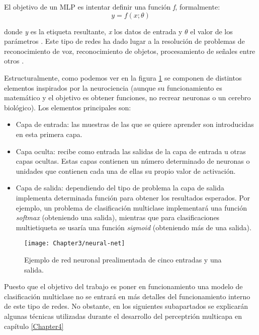 
El objetivo de un MLP es intentar definir una función \textit{f}, formalmente:
\begin{equation}
	y=f(x;\theta)
\end{equation}

donde \textit{y} es la etiqueta resultante, \textit{x} los datos de entrada y $\theta$ el valor de los parámetros \cite{Goodfellow-et-al-2016-Book}. Este tipo de redes ha dado lugar a la resolución de problemas de reconocimiento de voz, reconocimiento de objetos, procesamiento de señales entre otros \cite{DBLP:journals/corr/abs-1206-5538}.

Estructuralmente, como podemos ver en la figura \ref{fig:red-neuronal} se componen de distintos elementos inspirados
por la neurociencia \cite{riesenhuber1999hierarchical} (aunque su funcionamiento es matemático y el objetivo es obtener funciones, no recrear neuronas o un cerebro biológico). Los elementos principales son:


\begin{itemize}
	\item Capa de entrada: las muestras de las que se quiere aprender son introducidas en esta primera capa.

	\item Capa oculta: recibe como entrada las salidas de la capa de entrada u otras capas ocultas. Estas capas
	contienen un número determinado de neuronas o unidades que contienen cada una de ellas su propio valor de
	activación.

	\item Capa de salida: dependiendo del tipo de problema la capa de salida implementa determinada función para
	obtener los resultados esperados. Por ejemplo, un problema de clasificación multiclase implementará una
	función \textit{softmax} (obteniendo una salida), mientras que para clasificaciones multietiqueta se usaría
	una función \textit{sigmoid} (obteniendo más de una salida).
\end{itemize}


\begin{figure}[htp]
    \centering
    \texttt{[image: Chapter3/neural-net]}
\caption{Ejemplo de red neuronal prealimentada de cinco entradas y una salida.}
\label{fig:red-neuronal}
\end{figure}



Puesto que el objetivo del trabajo es poner en funcionamiento una modelo de clasificación multiclase no se entrará en más detalles del funcionamiento interno de este tipo de redes. No obstante, en los siguientes subapartados se explicarán algunas técnicas utilizadas durante el desarrollo del perceptrión multicapa en capítulo \ref{Chapter4}

